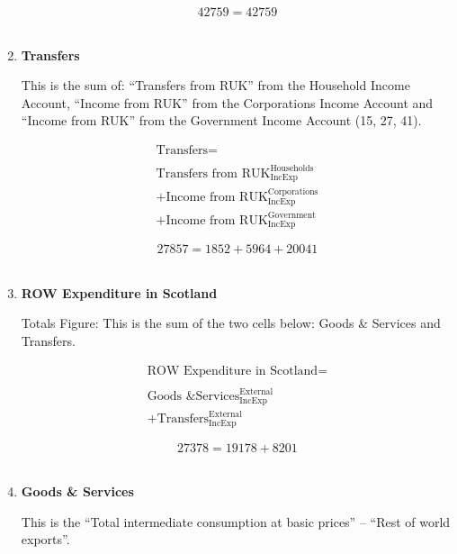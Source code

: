 \begin{enumerate}
\begin{equation} \nonumber
42759 = 42759
\end{equation}\\


\item \textbf {Transfers}

This is the sum of: ``Transfers from RUK'' from the Household Income Account, ``Income from RUK'' from the Corporations Income Account and ``Income from RUK'' from the Government Income Account (15, 27, 41).

\begin{equation}
\begin{split}
\text{Transfers} =  \\ \\
\text{Transfers from RUK}^\text{Households}_\text{IncExp}\\
+\text{Income from RUK}^\text{Corporations}_\text{IncExp}\\
+\text{Income from RUK}^\text{Government}_\text{IncExp}
\end{split} \label{eq:2.5.64}
\end{equation}

\begin{equation} \nonumber
27857 = 1852+5964+20041
\end{equation}\\


\item \textbf {ROW Expenditure in Scotland}

Totals Figure: This is the sum of the two cells below: Goods \& Services and Transfers.

\begin{equation}
\begin{split}
\text{ROW Expenditure in Scotland} =  \\ \\
\text{Goods \& Services}^\text{External}_\text{IncExp}\\
+\text{Transfers}^\text{External}_\text{IncExp}
\end{split} \label{eq:2.5.65}
\end{equation}

\begin{equation} \nonumber
27378 = 19178+8201
\end{equation}\\


\item \textbf {Goods \& Services}

This is the ``Total intermediate consumption at basic prices'' – ``Rest of world exports''. \cite{ScotGov2013a}


\end{enumerate}
